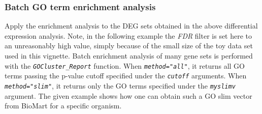 \documentclass[14pt,]{article}
\begin{document}
\hypertarget{batch-go-term-enrichment-analysis}{%
\subsubsection{Batch GO term enrichment analysis}\label{batch-go-term-enrichment-analysis}}

Apply the enrichment analysis to the DEG sets obtained in the above differential expression analysis. Note, in the following example the \emph{FDR} filter is set here to an unreasonably high value, simply because of the small size of the toy data set used in this vignette. Batch enrichment analysis of many gene sets is performed with the \emph{\texttt{GOCluster\_Report}} function. When \emph{\texttt{method="all"}}, it returns all GO terms passing the p-value cutoff specified under the \emph{\texttt{cutoff}} arguments. When \emph{\texttt{method="slim"}}, it returns only the GO terms specified under the \emph{\texttt{myslimv}} argument. The given example shows how one can obtain such a GO slim vector from BioMart for a specific organism.
\end{document}
